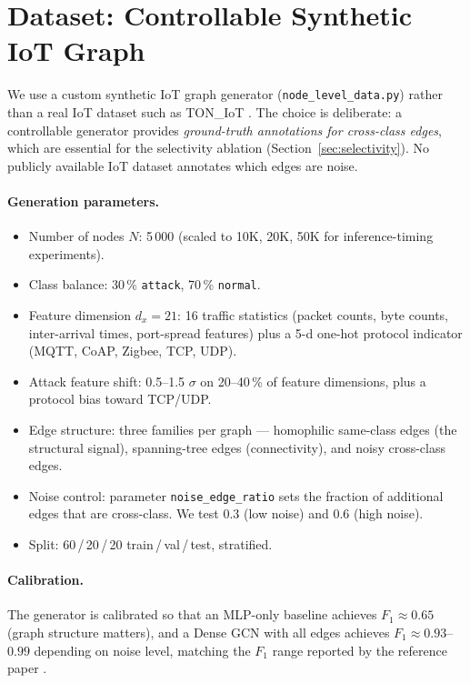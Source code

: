 \documentclass[11pt,a4paper]{report}
\theoremstyle{definition}
\theoremstyle{remark}
\begin{document}
\section{Dataset: Controllable Synthetic IoT Graph}

We use a custom synthetic IoT graph generator
(\texttt{node\_level\_data.py}) rather than a real IoT dataset such as
TON\_IoT \cite{moustafa2020toniot}. The choice is deliberate: a
controllable generator provides \emph{ground-truth annotations for
cross-class edges}, which are essential for the selectivity ablation
(Section~\ref{sec:selectivity}). No publicly available IoT dataset
annotates which edges are noise.

\paragraph{Generation parameters.}
\begin{itemize}[leftmargin=1.6em]
\item Number of nodes $N$: 5\,000 (scaled to 10K, 20K, 50K for
inference-timing experiments).
\item Class balance: 30\,\% \texttt{attack}, 70\,\% \texttt{normal}.
\item Feature dimension $d_x = 21$: 16 traffic statistics
(packet counts, byte counts, inter-arrival times, port-spread features)
plus a 5-d one-hot protocol indicator (MQTT, CoAP, Zigbee, TCP, UDP).
\item Attack feature shift: 0.5--1.5 $\sigma$ on 20--40\,\% of feature
dimensions, plus a protocol bias toward TCP/UDP.
\item Edge structure: three families per graph --- homophilic same-class
edges (the structural signal), spanning-tree edges (connectivity), and
noisy cross-class edges.
\item Noise control: parameter \texttt{noise\_edge\_ratio} sets the
fraction of additional edges that are cross-class. We test 0.3 (low
noise) and 0.6 (high noise).
\item Split: 60\,/\,20\,/\,20 train\,/\,val\,/\,test, stratified.
\end{itemize}

\paragraph{Calibration.}
The generator is calibrated so that an MLP-only baseline achieves
$F_1 \approx 0.65$ (graph structure matters), and a Dense GCN with all
edges achieves $F_1 \approx 0.93$--$0.99$ depending on noise level,
matching the $F_1$ range reported by the reference paper
\cite{villegas2023gnn}.
\end{document}
